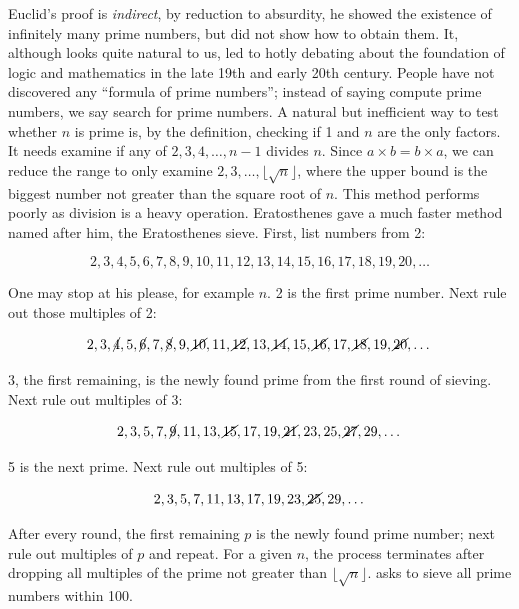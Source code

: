 \documentclass[b5paper]{article}
\begin{document}
\label{sec:sieve} 
Euclid's proof is \emph{indirect}, by reduction to absurdity, he showed the existence of infinitely many prime numbers, but did not show how to obtain them. It, although looks quite natural to us, led to hotly debating about the foundation of logic and mathematics in the late 19th and early 20th century. People have not discovered any \enquote{formula of prime numbers}; instead of saying compute prime numbers, we say search for prime numbers. A natural but inefficient way to test whether $n$ is prime is, by the definition, checking if 1 and $n$ are the only factors. It needs examine if any of $2, 3, 4, \dotsc, n - 1$ divides $n$. Since $a \times b = b \times a$, we can reduce the range to only examine $2, 3, \dotsc, \lfloor \sqrt{n} \rfloor$, where the upper bound is the biggest number not greater than the square root of $n$. This method performs poorly as division is a heavy operation. Eratosthenes gave a much faster method named after him, the Eratosthenes sieve. First, list numbers from 2:

\[2, 3, 4, 5, 6, 7, 8, 9, 10, 11, 12, 13, 14, 15, 16, 17, 18, 19, 20, \dotsc \]

One may stop at his please, for example $n$. 2 is the first prime number. Next rule out those multiples of 2:

\[2, 3, \cancel{4}, 5, \cancel{6}, 7, \cancel{8}, 9, \cancel{10}, 11, \cancel{12}, 13, \cancel{14}, 15, \cancel{16}, 17, \cancel{18}, 19, \cancel{20}, \dotsc\]

3, the first remaining, is the newly found prime from the first round of sieving. Next rule out multiples of 3:

\[2, 3, 5, 7, \cancel{9}, 11, 13, \cancel{15}, 17, 19, \cancel{21}, 23, 25, \cancel{27}, 29, \dotsc\]

5 is the next prime. Next rule out multiples of 5:

\[2, 3, 5, 7, 11, 13, 17, 19, 23, \cancel{25}, 29, \dotsc\]

After every round, the first remaining $p$ is the newly found prime number; next rule out multiples of $p$ and repeat. For a given $n$, the process terminates after dropping all multiples of the prime not greater than $\lfloor \sqrt{n} \rfloor$.  asks to sieve all prime numbers within 100.
\end{document}
